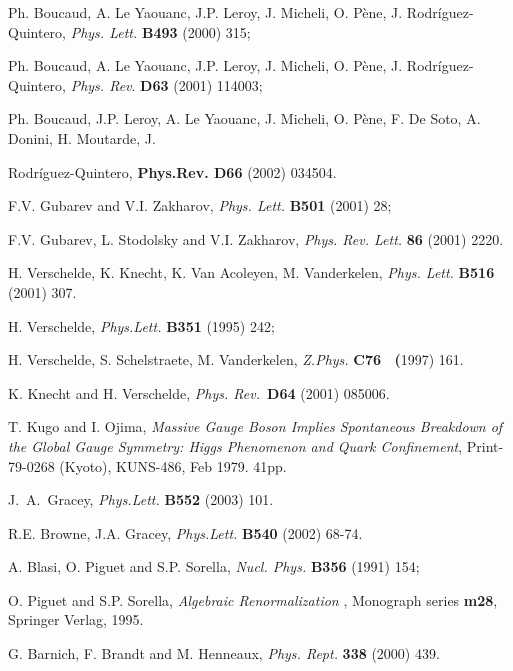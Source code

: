 \documentclass[a4paper,12pt]{article}
\begin{document}
\begin{thebibliography}{99}
  Ph. Boucaud, A. Le Yaouanc, J.P. Leroy, J. Micheli, O.
P\`{e}ne, J. Rodr\'{i}guez-Quintero, \emph{Phys. Lett.} \textbf{B493} (2000)
315;

Ph. Boucaud, A. Le Yaouanc, J.P. Leroy, J. Micheli, O. P\`{e}ne, J.
Rodr\'{i}guez-Quintero, \emph{Phys. Rev}. \textbf{D63} (2001) 114003;

Ph. Boucaud, J.P. Leroy, A. Le Yaouanc, J. Micheli, O. P\`{e}ne, F. De Soto,
A. Donini, H. Moutarde, J.

Rodr\'{i}guez-Quintero, \textbf{Phys.Rev. D66} (2002) 034504.

  F.V. Gubarev and V.I. Zakharov, \emph{Phys. Lett.} \textbf{B501 
}(2001) 28;

F.V. Gubarev, L. Stodolsky and V.I. Zakharov, \emph{Phys. Rev. Lett.} 
\textbf{86} (2001) 2220.

  H. Verschelde, K. Knecht, K. Van Acoleyen, M. Vanderkelen, 
\emph{Phys. Lett.} \textbf{B516} (2001) 307.

  H. Verschelde, \emph{Phys.Lett. }\textbf{B351} (1995) 242;

H. Verschelde, S. Schelstraete, M. Vanderkelen, \emph{Z.Phys. }\textbf{C76 \
(}1997) 161.

K. Knecht and H. Verschelde, \emph{Phys. Rev.\ }\textbf{D64} (2001) 085006.

  T. Kugo and I. Ojima, \emph{Massive Gauge Boson Implies
Spontaneous Breakdown of the Global Gauge Symmetry: Higgs Phenomenon and
Quark Confinement}, Print-79-0268 (Kyoto), KUNS-486, Feb 1979. 41pp.

  J.~A.~Gracey, \emph{Phys.Lett.} \textbf{B552} (2003) 101.

R.E. Browne, J.A. Gracey, \emph{Phys.Lett.} \textbf{B540} (2002) 68-74.

  A. Blasi, O. Piguet and S.P. Sorella, \emph{Nucl. Phys. }%
\textbf{B356 }(1991) 154;

  O. Piguet and S.P. Sorella, \emph{Algebraic Renormalization}%
, Monograph series \textbf{m28}, Springer Verlag, 1995.\emph{\ }

  G. Barnich, F. Brandt and M. Henneaux, \emph{Phys. Rept.} 
\textbf{338 }(2000) 439.
\end{thebibliography}
\end{document}
